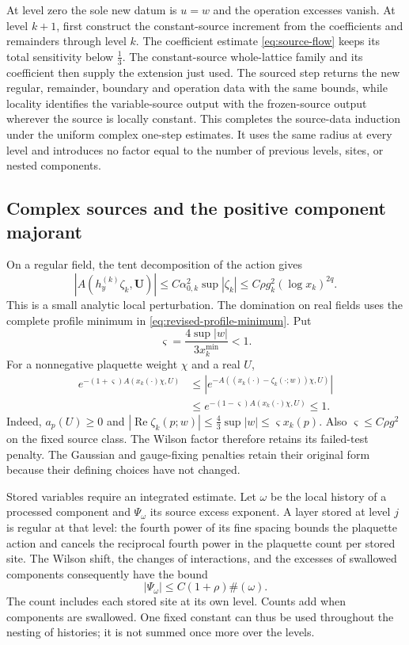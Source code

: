 \documentclass[11pt,letterpaper,reqno]{amsart}
\theoremstyle{definition}
\theoremstyle{remark}
\begin{document}
At level zero the sole new datum is $u=w$ and the operation
excesses vanish. At level $k+1$, first construct the constant-source
increment from the coefficients and remainders through level $k$.
The coefficient estimate \eqref{eq:source-flow} keeps its total
sensitivity below $\frac13$. The constant-source whole-lattice
family and its coefficient then supply the extension just used.
The sourced step returns the new regular, remainder, boundary and
operation data with the same bounds, while locality identifies
the variable-source output with the frozen-source output wherever
the source is locally constant. This completes the source-data
induction under the uniform complex one-step estimates. It uses
the same radius at every level and introduces no factor equal to
the number of previous levels, sites, or nested components.

\subsection{Complex sources and the positive component majorant}
\label{sec:source-component-majorant}

On a regular field, the tent decomposition of the action gives
\[
 |A(h_y^{(k)}\zeta_k,\mathbf U)|
   \le C\alpha_{0,k}^2\sup|\zeta_k|
   \le C\rho g_k^2(\log x_k)^{2q}.
\]
This is a small analytic local perturbation. The domination on
real fields uses the complete profile minimum in
\eqref{eq:revised-profile-minimum}. Put
\[
 \varsigma=\frac{4\sup|w|}{3x_k^{\min}}<1.
\]
For a nonnegative plaquette weight $\chi$ and a real $U$,
\begin{equation}\label{eq:revised-source-domination}
 \begin{split}
 e^{-(1+\varsigma)A(x_k(\cdot)\chi,U)}
 &\le\left|e^{-A((x_k(\cdot)-\zeta_k(\cdot;w))\chi,U)}\right|\\
 &\le e^{-(1-\varsigma)A(x_k(\cdot)\chi,U)}\le1.
 \end{split}
\end{equation}
Indeed, $a_p(U)\ge0$ and
$|\operatorname{Re}\zeta_k(p;w)|\le\frac43\sup|w|
\le\varsigma x_k(p)$. Also $\varsigma\le C\rho g^2$
on the fixed source class.
The Wilson factor therefore retains its failed-test penalty. The
Gaussian and gauge-fixing penalties retain their original form because
their defining choices have not changed.

Stored variables require an integrated estimate. Let $\omega$ be the
local history of a processed component and $\Psi_\omega$ its source
excess exponent. A layer stored at level $j$ is regular at that level:
the fourth power of its fine spacing bounds the plaquette action and
cancels the reciprocal fourth power in the plaquette count per stored
site. The Wilson shift, the changes of interactions, and the excesses
of swallowed components consequently have the bound
\[
 |\Psi_\omega|\le C(1+\rho)\#(\omega).
\]
The count includes each stored site at its own level. Counts add when
components are swallowed. One fixed constant can thus be used throughout
the nesting of histories; it is not summed once more over the levels.
\end{document}
